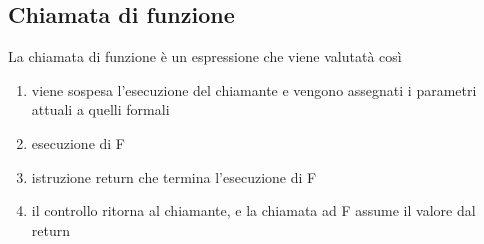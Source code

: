 \documentclass{article}
\begin{document}
\subsection{Chiamata di funzione}
La chiamata di funzione è un espressione che viene valutatà così
\begin{enumerate}
    \item viene sospesa l'esecuzione del chiamante e vengono assegnati i parametri attuali a quelli formali
    \item esecuzione di F
    \item istruzione return che termina l'esecuzione di F
    \item il controllo ritorna al chiamante, e la chiamata ad F assume il valore  dal return
\end{enumerate}
\end{document}
